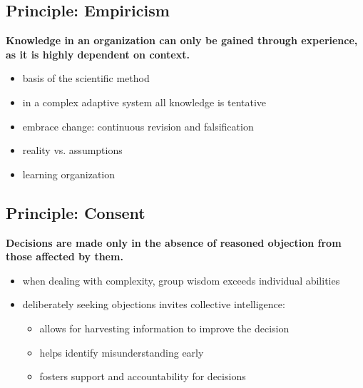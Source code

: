 \subsection{Principle: Empiricism}
\label{principle:empiricism}

\textbf{Knowledge in an organization can only be gained through experience, as it is highly dependent on context.}

\begin{itemize}
\item basis of the scientific method

\item in a complex adaptive system all knowledge is tentative

\item embrace change: continuous revision and falsification

\item reality vs. assumptions

\item learning organization

\end{itemize}

\subsection{Principle: Consent}
\label{principle:consent}

\textbf{Decisions are made only in the absence of reasoned objection from those affected by them.}

\begin{itemize}
\item when dealing with complexity, group wisdom exceeds individual abilities

\item deliberately seeking objections invites collective intelligence:

\begin{itemize}
\item allows for harvesting information to improve the decision

\item helps identify misunderstanding early

\item fosters support and accountability for decisions

\end{itemize}

\end{itemize}

